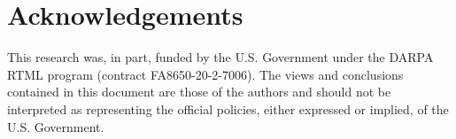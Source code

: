 \section{Acknowledgements}

This research was, in part, funded by the U.S. Government under the DARPA RTML program (contract FA8650-20-2-7006). The views and conclusions contained in this document are those of the authors and should not be interpreted as representing the official policies, either expressed or implied, of the U.S. Government.
